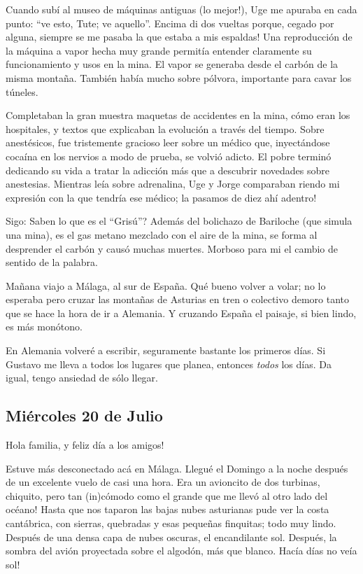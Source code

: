 Cuando sub\'i al museo de m\'aquinas antiguas (\textexclamdown lo mejor!), Uge
me apuraba en cada punto: ``ve esto, Tute; ve aquello''. \textexclamdown
Encima di dos vueltas porque, cegado por alguna, siempre se me pasaba la que
estaba a mis espaldas! Una reproducci\'on de la m\'aquina a vapor hecha muy
grande permit\'ia entender claramente su funcionamiento y usos en la mina. El
vapor se generaba desde el carb\'on de la misma monta\~na. Tambi\'en hab\'ia
mucho sobre p\'olvora, importante para cavar los t\'uneles.

Completaban la gran muestra maquetas de accidentes en la mina, c\'omo eran los
hospitales, y textos que explicaban la evoluci\'on a trav\'es del tiempo. Sobre
anest\'esicos, fue tristemente gracioso leer sobre un m\'edico que,
inyect\'andose coca\'ina en los nervios a modo de prueba, se volvi\'o adicto. El
pobre termin\'o dedicando su vida a tratar la adicci\'on m\'as que a descubrir
novedades sobre anestesias. Mientras le\'ia sobre adrenalina, Uge y Jorge
comparaban riendo mi expresi\'on con la que tendr\'ia ese m\'edico;
\textexclamdown la pasamos de diez ah\'i adentro!

Sigo: \textquestiondown Saben lo que es el ``Gris\'u''? Adem\'as del bolichazo
de Bariloche (que simula una mina), es el gas metano mezclado con el aire de
la mina, se forma al desprender el carb\'on y caus\'o muchas muertes. Morboso
para mi el cambio de sentido de la palabra.

Ma\~nana viajo a M\'alaga, al sur de Espa\~na. Qu\'e bueno volver a volar; no
lo esperaba pero cruzar las monta\~nas de Asturias en tren o colectivo demoro
tanto que se hace la hora de ir a Alemania. Y cruzando Espa\~na el paisaje, si
bien lindo, es m\'as mon\'otono.

En Alemania volver\'e a escribir, seguramente bastante los primeros d\'ias. Si
Gustavo me lleva a todos los lugares que planea, entonces \emph{todos} los
d\'ias. Da igual, tengo ansiedad de s\'olo llegar.

\subsection*{Mi\'ercoles 20 de Julio}

\textexclamdown Hola familia, y feliz d\'ia a los amigos!

Estuve m\'as desconectado ac\'a en M\'alaga. Llegu\'e el Domingo a la noche
despu\'es de un excelente vuelo de casi una hora. Era un avioncito de dos
turbinas, chiquito, \textexclamdown pero tan (in)c\'omodo como el grande que
me llev\'o al otro lado del oc\'eano! Hasta que nos taparon las bajas nubes
asturianas pude ver la costa cant\'abrica, con sierras, quebradas y esas
peque\~nas finquitas; todo muy lindo. Despu\'es de una densa capa de nubes
oscuras, el encandilante sol. Despu\'es, la sombra del avi\'on proyectada
sobre el algod\'on, m\'as que blanco. \textexclamdown Hac\'ia d\'ias no ve\'ia
sol!

